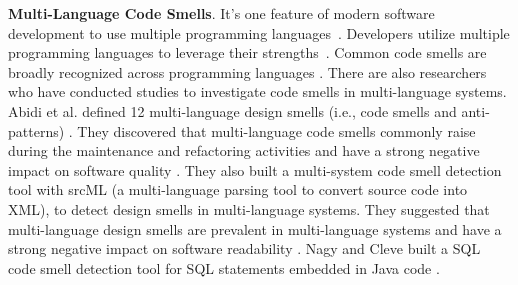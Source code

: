 
{\bf Multi-Language Code Smells}. It's one feature of modern software
development to use multiple programming languages~\cite{723183}. Developers
utilize multiple programming languages to leverage their
strengths~\cite{7476675}.
%
Common code smells are broadly recognized across programming languages
\cite{PMD,CheckStyle,Pysmell,Jscent,DesigniteJava}. There are also researchers
who have conducted studies to investigate code smells in multi-language systems.
Abidi et al. defined 12 multi-language design smells (i.e., code smells and
anti-patterns) \cite{MultiLanguageCodeSmells}. They discovered that
multi-language code smells commonly raise during the maintenance and refactoring
activities and have a strong negative impact on software quality \cite{Abidi2}.
They also built a multi-system code smell detection tool with srcML (a
multi-language parsing tool to convert source code into XML), to detect design
smells in multi-language systems. They suggested that multi-language design
smells are prevalent in multi-language systems and have a strong negative impact
on software readability \cite{Fault-Prone}. Nagy and Cleve built a SQL code
smell detection tool for SQL statements embedded in Java code \cite{SQLInJava}.
